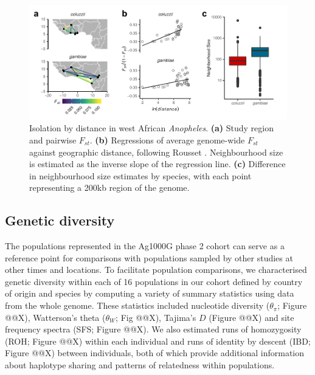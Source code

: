 \documentclass[a4paper,11pt,abstracton,hidelinks]{scrartcl}
\begin{document}
\begin{figure}[H]
	\begin{center}
		\includegraphics*[width=6.3in]{artwork/west_africa_multipanel_edit_NOD.pdf}
	\end{center}
	\caption{Isolation by distance in west African \textit{Anopheles}. \textbf{(a)} Study region and pairwise $F_{st}$. \textbf{(b)} Regressions of average genome-wide $F_{st}$ against geographic distance, following Rousset \cite{rousset1997genetic}. Neighbourhood size is estimated as the inverse slope of the regression line. \textbf{(c)} Difference in neighbourhood size estimates by species, with each point representing a 200kb region of the genome.}
	\label{fig:ibd_fig}
\end{figure}


\subsection*{Genetic diversity}


%
The populations represented in the Ag1000G phase 2 cohort can serve as a reference point for comparisons with populations sampled by other studies at other times and locations. 
%
To facilitate population comparisons, we characterised genetic diversity within each of 16 populations in our cohort defined by country of origin and species by computing a variety of summary statistics using data from the whole genome.
%
These statistics included nucleotide diversity ($\theta_{\pi}$; Figure @@X), Watterson's theta ($\theta_{W}$; Fig @@X), Tajima's $D$ (Figure @@X) and site frequency spectra (SFS; Figure @@X). 
%
We also estimated runs of homozygosity (ROH; Figure @@X) within each individual and runs of identity by descent (IBD; Figure @@X) between individuals, both of which provide additional information about haplotype sharing and patterns of relatedness within populations. 
\end{document}
